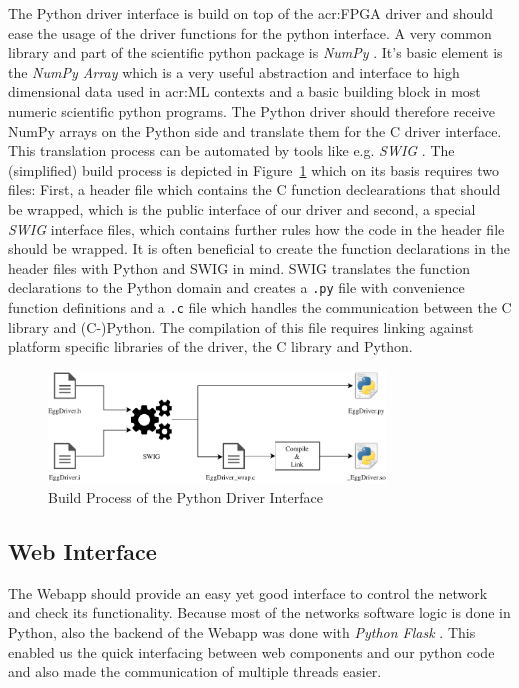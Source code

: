 The Python driver interface is build on top of the \gls{acr:FPGA} driver and should ease the usage of the driver functions for the python interface. A very common library and part of the scientific python package is \emph{NumPy} \cite{Virtanen:2020aa}. It's basic element is the \emph{NumPy Array} \cite{Walt:2011aa} which is a very useful abstraction and interface to high dimensional data used in \gls{acr:ML} contexts and a basic building block in most numeric scientific python programs. The Python driver should therefore receive NumPy arrays on the Python side and translate them for the C driver interface. 
This translation process can be automated by tools like e.g. \emph{SWIG} \cite{Beazley:2003aa}.	The (simplified) build process is depicted in Figure~\ref{fig:sw-python-eggdriver-build} which on its basis requires two files: 
First, a header file which contains the C function declearations that should be wrapped, which is the public interface of our driver and second, a special \emph{SWIG} interface files, which contains further rules how the code in the header file should be wrapped. It is often beneficial to create the function declarations in the header files with Python and SWIG in mind. 
SWIG translates the function declarations to the Python domain and creates a \texttt{.py} file with convenience function definitions and a \texttt{.c} file which handles the communication between the C library and (C-)Python. The compilation of this file requires linking against platform specific libraries of the driver, the C library and Python.

\begin{figure}[hbt]
  \centering
  \includegraphics[width=0.8\textwidth]{img/pydriver}
  \caption{Build Process of the Python Driver Interface}
  \label{fig:sw-python-eggdriver-build}
\end{figure}


\subsection{Web Interface}

The Webapp should provide an easy yet good interface to control the network and check its functionality. Because most of the networks software logic is done in Python, also the backend of the Webapp was done with \emph{Python Flask} \cite{Pallets:2020aa}. This enabled us the quick interfacing between web components and our python code and also made the communication of multiple threads easier.

